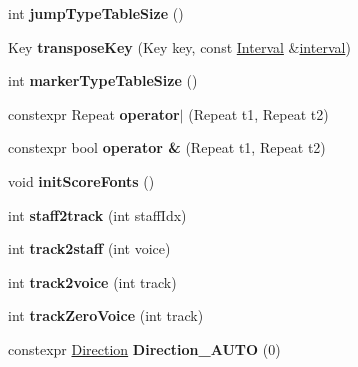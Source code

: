 \begin{DoxyCompactItemize}
\item 
\mbox{\label{namespace_ms_af32e7289682029178e1d21bbbc5803b0}} 
int {\bfseries jump\+Type\+Table\+Size} ()
\item 
\mbox{\label{namespace_ms_a0a2152aa6e63bd7c1b0a39f8d6577b96}} 
Key {\bfseries transpose\+Key} (Key key, const \hyperlink{struct_ms_1_1_interval}{Interval} \&\hyperlink{class_interval}{interval})
\item 
\mbox{\label{namespace_ms_ae34cc5c44e5439db9f86aefb09ecf873}} 
int {\bfseries marker\+Type\+Table\+Size} ()
\item 
\mbox{\label{namespace_ms_acab0498f8e3039520b75c591c677103b}} 
constexpr Repeat {\bfseries operator$\vert$} (Repeat t1, Repeat t2)
\item 
\mbox{\label{namespace_ms_a4cbefe772e98a31a81203fa743d3d371}} 
constexpr bool {\bfseries operator \&} (Repeat t1, Repeat t2)
\item 
\mbox{\label{namespace_ms_a7ebde6945cb422efa9d65d4d2ba5dd14}} 
void {\bfseries init\+Score\+Fonts} ()
\item 
\mbox{\label{namespace_ms_a9b94748a1c466ed6e89f2c80e57b644b}} 
int {\bfseries staff2track} (int staff\+Idx)
\item 
\mbox{\label{namespace_ms_ae665d4585b944f2ec91a33a5c89732bd}} 
int {\bfseries track2staff} (int voice)
\item 
\mbox{\label{namespace_ms_a6d8f7f5dbb7c772d54ef4d15a61bb668}} 
int {\bfseries track2voice} (int track)
\item 
\mbox{\label{namespace_ms_a469dd00a292aca0acb3e57ad0222715f}} 
int {\bfseries track\+Zero\+Voice} (int track)
\item 
\mbox{\label{namespace_ms_ae38e2aced3e0f7ec39ccf7fabb40f3e8}} 
constexpr \hyperlink{class_ms_1_1_direction}{Direction} {\bfseries Direction\+\_\+\+A\+U\+TO} (0)
\item 
\mbox{\label{namespace_ms_ac6559e79ee889e654d0a40e2fe6cb020}} 

\end{DoxyCompactItemize}
